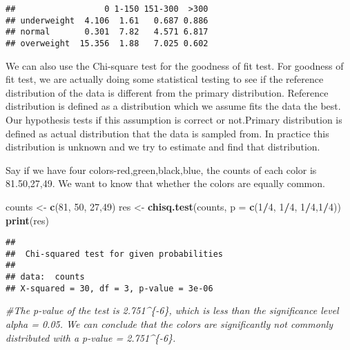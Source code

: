 \documentclass[]{book}
\newenvironment{Shaded}{\begin{snugshade}}{\end{snugshade}}
\newcommand{\KeywordTok}[1]{\textcolor[rgb]{0.13,0.29,0.53}{\textbf{#1}}}
\newcommand{\DataTypeTok}[1]{\textcolor[rgb]{0.13,0.29,0.53}{#1}}
\newcommand{\DecValTok}[1]{\textcolor[rgb]{0.00,0.00,0.81}{#1}}
\newcommand{\StringTok}[1]{\textcolor[rgb]{0.31,0.60,0.02}{#1}}
\newcommand{\CommentTok}[1]{\textcolor[rgb]{0.56,0.35,0.01}{\textit{#1}}}
\newcommand{\OperatorTok}[1]{\textcolor[rgb]{0.81,0.36,0.00}{\textbf{#1}}}
\newcommand{\NormalTok}[1]{#1}
\theoremstyle{definition}
\theoremstyle{definition}
\theoremstyle{definition}
\theoremstyle{remark}
\begin{document}
\begin{verbatim}
##                  0 1-150 151-300  >300
## underweight  4.106  1.61   0.687 0.886
## normal       0.301  7.82   4.571 6.817
## overweight  15.356  1.88   7.025 0.602
\end{verbatim}

We can also use the Chi-square test for the goodness of fit test. For
goodness of fit test, we are actually doing some statistical testing to
see if the reference distribution of the data is different from the
primary distribution. Reference distribution is defined as a
distribution which we assume fits the data the best. Our hypothesis
tests if this assumption is correct or not.Primary distribution is
defined as actual distribution that the data is sampled from. In
practice this distribution is unknown and we try to estimate and find
that distribution.

Say if we have four colors-red,green,black,blue, the counts of each
color is 81.50,27,49. We want to know that whether the colors are
equally common.

\begin{Shaded}
\begin{Highlighting}[]
\NormalTok{counts <-}\StringTok{ }\KeywordTok{c}\NormalTok{(}\DecValTok{81}\NormalTok{, }\DecValTok{50}\NormalTok{, }\DecValTok{27}\NormalTok{,}\DecValTok{49}\NormalTok{)}
\NormalTok{res <-}\StringTok{ }\KeywordTok{chisq.test}\NormalTok{(counts, }\DataTypeTok{p =} \KeywordTok{c}\NormalTok{(}\DecValTok{1}\OperatorTok{/}\DecValTok{4}\NormalTok{, }\DecValTok{1}\OperatorTok{/}\DecValTok{4}\NormalTok{, }\DecValTok{1}\OperatorTok{/}\DecValTok{4}\NormalTok{,}\DecValTok{1}\OperatorTok{/}\DecValTok{4}\NormalTok{))}
\KeywordTok{print}\NormalTok{(res)}
\end{Highlighting}
\end{Shaded}

\begin{verbatim}
## 
##  Chi-squared test for given probabilities
## 
## data:  counts
## X-squared = 30, df = 3, p-value = 3e-06
\end{verbatim}

\begin{Shaded}
\begin{Highlighting}[]
\CommentTok{#The p-value of the test is 2.751^\{-6\}, which is less than the significance level alpha = 0.05. We can conclude that the colors are significantly not commonly distributed with a p-value = 2.751^\{-6\}.}
\end{Highlighting}
\end{Shaded}
\end{document}
